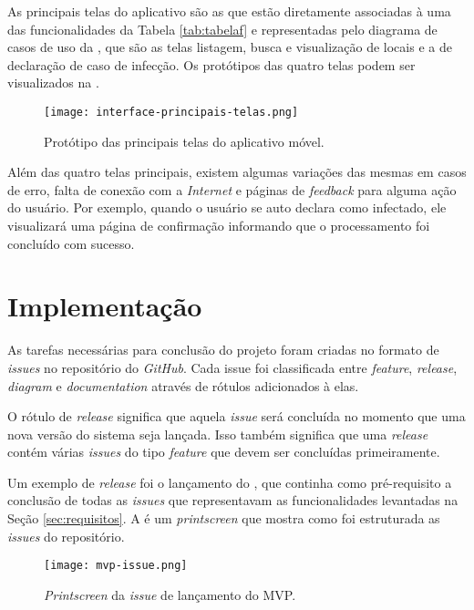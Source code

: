 As principais telas do aplicativo são as que estão diretamente associadas à uma das funcionalidades da Tabela \ref{tab:tabelaf} e representadas pelo diagrama de casos de uso da , que são as telas listagem, busca e visualização de locais e a de declaração de caso de infecção. Os protótipos das quatro telas podem ser visualizados na .

\begin{figure}[!htb]
  \centering
  \texttt{[image: interface-principais-telas.png]}
  \caption{Protótipo das principais telas do aplicativo móvel.}
  \label{fig:principaistelas}
\end{figure}

Além das quatro telas principais, existem algumas variações das mesmas em casos de erro, falta de conexão com a \textit{Internet} e páginas de \textit{feedback} para alguma ação do usuário. Por exemplo, quando o usuário se auto declara como infectado, ele visualizará uma página de confirmação informando que o processamento foi concluído com sucesso.

\section{Implementação}\label{sec:implementacao}

As tarefas necessárias para conclusão do projeto foram criadas no formato de \textit{issues} no repositório do \textit{GitHub}. Cada issue foi classificada entre \textit{feature}, \textit{release}, \textit{diagram} e \textit{documentation} através de rótulos adicionados à elas.

O rótulo de \textit{release} significa que aquela \textit{issue} será concluída no momento que uma nova versão do sistema seja lançada. Isso também significa que uma \textit{release} contém várias \textit{issues} do tipo \textit{feature} que devem ser concluídas primeiramente.

Um exemplo de \textit{release} foi o lançamento do , que continha como pré-requisito a conclusão de todas as \textit{issues} que representavam as funcionalidades levantadas na Seção \ref{sec:requisitos}. A  é um \textit{printscreen} que mostra como foi estruturada as \textit{issues} do repositório.

\begin{figure}[!htb]
  \centering
  \texttt{[image: mvp-issue.png]}
  \caption{\textit{Printscreen} da \textit{issue} de lançamento do MVP.}
  \label{fig:issuemvp}
\end{figure}

